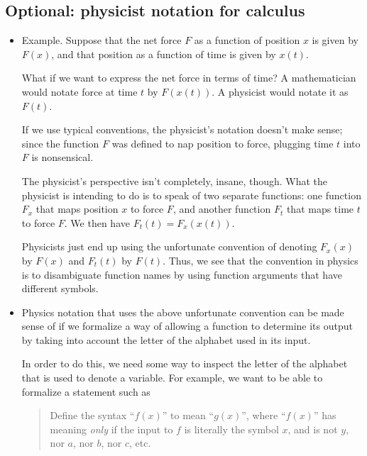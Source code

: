 \subsection*{Optional: physicist notation for calculus}

\begin{itemize}
    \item Example. Suppose that the net force $F$ as a function of position $x$ is given by $F(x)$, and that position as a function of time is given by $x(t)$.
    
    What if we want to express the net force in terms of time? A mathematician would notate force at time $t$ by $F(x(t))$. A physicist would notate it as $F(t)$.
    
    If we use typical conventions, the physicist's notation doesn't make sense; since the function $F$ was defined to nap position to force, plugging time $t$ into $F$ is nonsensical. 
    
    The physicist's perspective isn't completely, insane, though. What the physicist is intending to do is to speak of two separate functions: one function $F_x$ that maps position $x$ to force $F$, and another function $F_t$ that maps time $t$ to force $F$. We then have $F_t(t) = F_x(x(t))$.
    
    Physicists just end up using the unfortunate convention of denoting $F_x(x)$ by $F(x)$ and $F_t(t)$ by $F(t)$. Thus, we see that the convention in physics is to disambiguate function names by using function arguments that have different symbols.

    \item Physics notation that uses the above unfortunate convention can be made sense of if we formalize a way of allowing a function to determine its output by taking into account the letter of the alphabet used in its input.
    
    \newcommand{\AAA}{\mathcal{A}}
    \newcommand{\BBB}{\mathcal{B}}
    \newcommand{\sym}{\text{sym}}
    \newcommand{\val}{\text{val}}
    
    In order to do this, we need some way to inspect the letter of the alphabet that is used to denote a variable. For example, we want to be able to formalize a statement such as
    
    \begin{quotation}
        Define the syntax ``$f(x)$'' to mean ``$g(x)$'', where ``$f(x)$'' has meaning \textit{only} if the input to $f$ is literally the symbol $x$, and is not $y$, nor $a$, nor $b$, nor $c$, etc.
    \end{quotation}
    

\end{itemize}
